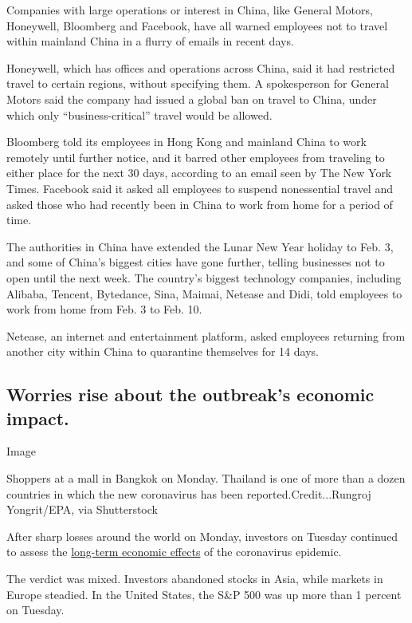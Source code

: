 Companies with large operations or interest in China, like General
Motors, Honeywell, Bloomberg and Facebook, have all warned employees not
to travel within mainland China in a flurry of emails in recent days.

Honeywell, which has offices and operations across China, said it had
restricted travel to certain regions, without specifying them. A
spokesperson for General Motors said the company had issued a global ban
on travel to China, under which only ``business-critical'' travel would
be allowed.

Bloomberg told its employees in Hong Kong and mainland China to work
remotely until further notice, and it barred other employees from
traveling to either place for the next 30 days, according to an email
seen by The New York Times. Facebook said it asked all employees to
suspend nonessential travel and asked those who had recently been in
China to work from home for a period of time.

The authorities in China have extended the Lunar New Year holiday to
Feb. 3, and some of China's biggest cities have gone further, telling
businesses not to open until the next week. The country's biggest
technology companies, including Alibaba, Tencent, Bytedance, Sina,
Maimai, Netease and Didi, told employees to work from home from Feb. 3
to Feb. 10.

Netease, an internet and entertainment platform, asked employees
returning from another city within China to quarantine themselves for 14
days.

\hypertarget{worries-rise-about-the-outbreaks-economic-impact}{%
\subsection{Worries rise about the outbreak's economic
impact.}\label{worries-rise-about-the-outbreaks-economic-impact}}

Image

Shoppers at a mall in Bangkok on Monday. Thailand is one of more than a
dozen countries in which the new coronavirus has been
reported.Credit...Rungroj Yongrit/EPA, via Shutterstock

After sharp losses around the world on Monday, investors on Tuesday
continued to assess the
\href{https://www.nytimes.com/2020/01/27/business/coronavirus-china-economic-impact.html}{long-term
economic effects} of the coronavirus epidemic.

The verdict was mixed. Investors abandoned stocks in Asia, while markets
in Europe steadied. In the United States, the S\&P 500 was up more than
1 percent on Tuesday.

